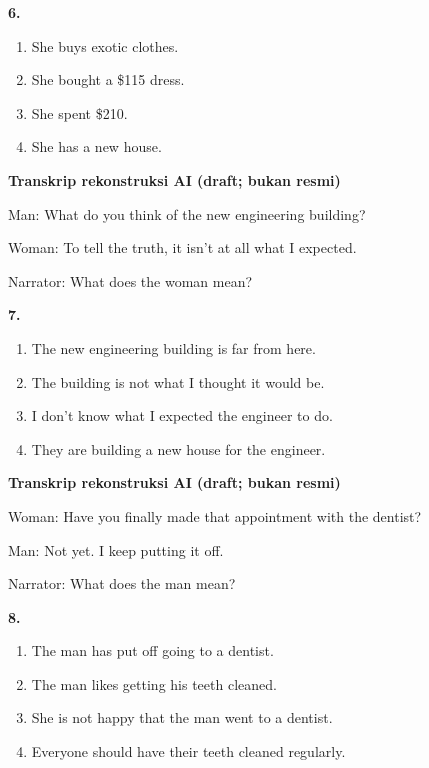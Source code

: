 \documentclass[12pt]{article}
\begin{document}
\noindent\textbf{6.}
\begin{enumerate}[label=(\Alph*),leftmargin=*,itemsep=0.2em]
\item She buys exotic clothes.
\item She bought a \$115 dress.
\item She spent \$210.
\item She has a new house.
\end{enumerate}
\par
\vspace{0.25\baselineskip}
\begin{exampleblock}
\textbf{Transkrip rekonstruksi AI (draft; bukan resmi)}\par
Man: What do you think of the new engineering building?\par
Woman: To tell the truth, it isn't at all what I expected.\par
Narrator: What does the woman mean?\par
\end{exampleblock}
\noindent\textbf{7.}
\begin{enumerate}[label=(\Alph*),leftmargin=*,itemsep=0.2em]
\item The new engineering building is far from here.
\item The building is not what I thought it would be.
\item I don't know what I expected the engineer to do.
\item They are building a new house for the engineer.
\end{enumerate}
\par
\vspace{0.25\baselineskip}
\begin{exampleblock}
\textbf{Transkrip rekonstruksi AI (draft; bukan resmi)}\par
Woman: Have you finally made that appointment with the dentist?\par
Man: Not yet. I keep putting it off.\par
Narrator: What does the man mean?\par
\end{exampleblock}
\noindent\textbf{8.}
\begin{enumerate}[label=(\Alph*),leftmargin=*,itemsep=0.2em]
\item The man has put off going to a dentist.
\item The man likes getting his teeth cleaned.
\item She is not happy that the man went to a dentist.
\item Everyone should have their teeth cleaned regularly.
\end{enumerate}
\end{document}
